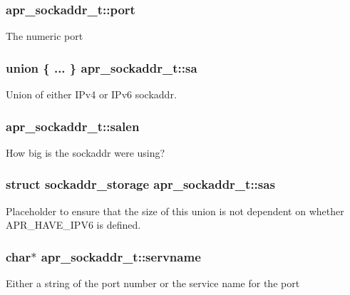 \subsubsection[{\texorpdfstring{port}{port}}]{ apr\+\_\+sockaddr\+\_\+t\+::port}\hypertarget{structapr__sockaddr__t_a174c19138de9c208f13ed71b5892e505}{}\label{structapr__sockaddr__t_a174c19138de9c208f13ed71b5892e505}
The numeric port 
\subsubsection[{\texorpdfstring{sa}{sa}}]{\setlength{\rightskip}{0pt plus 5cm}union \{ ... \}   apr\+\_\+sockaddr\+\_\+t\+::sa}\hypertarget{structapr__sockaddr__t_ade95595a2a33c108f71358bbb8a501cf}{}\label{structapr__sockaddr__t_ade95595a2a33c108f71358bbb8a501cf}
Union of either I\+Pv4 or I\+Pv6 sockaddr. 
\subsubsection[{\texorpdfstring{salen}{salen}}]{ apr\+\_\+sockaddr\+\_\+t\+::salen}\hypertarget{structapr__sockaddr__t_aef1d2a482f85eeab7b6bf0a7732a087a}{}\label{structapr__sockaddr__t_aef1d2a482f85eeab7b6bf0a7732a087a}
How big is the sockaddr we\textquotesingle{}re using? 
\subsubsection[{\texorpdfstring{sas}{sas}}]{\setlength{\rightskip}{0pt plus 5cm}struct sockaddr\+\_\+storage apr\+\_\+sockaddr\+\_\+t\+::sas}\hypertarget{structapr__sockaddr__t_ac823daa30be02ee1589b4b67615cef5f}{}\label{structapr__sockaddr__t_ac823daa30be02ee1589b4b67615cef5f}
Placeholder to ensure that the size of this union is not dependent on whether A\+P\+R\+\_\+\+H\+A\+V\+E\+\_\+\+I\+P\+V6 is defined. 
\subsubsection[{\texorpdfstring{servname}{servname}}]{\setlength{\rightskip}{0pt plus 5cm}char$\ast$ apr\+\_\+sockaddr\+\_\+t\+::servname}\hypertarget{structapr__sockaddr__t_a668335161a8347b9a34c600bff80b52f}{}\label{structapr__sockaddr__t_a668335161a8347b9a34c600bff80b52f}
Either a string of the port number or the service name for the port 
